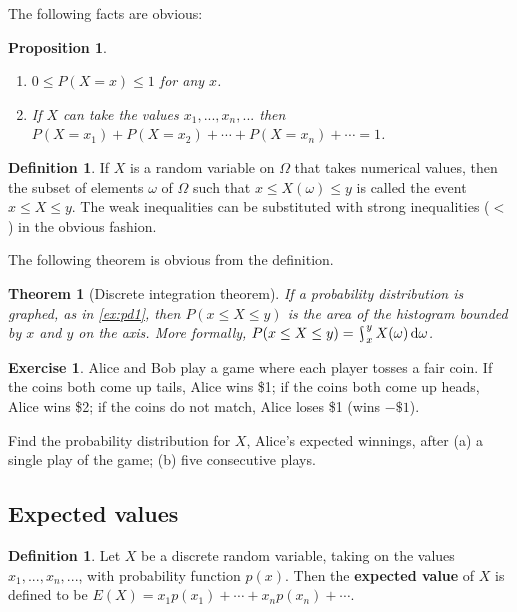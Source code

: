 \documentclass[a4paper,leqno]{article}
\DeclareMathOperator*{\rint}{\scalerel*{\rotatebox{17}{$\!\int\!$}}{\int}}
\numberwithin{equation}{section}
\newtheorem{thm}[equation]{Theorem}
\newtheorem{prp}[equation]{Proposition}
\theoremstyle{definition}
\newtheorem{defn}[equation]{Definition}
\newtheorem{exercise}[equation]{Exercise}
\theoremstyle{remark}
\newcommand{\df}{\textbf}
\begin{document}
The following facts are obvious:
\begin{prp}\label{prp:distfacts}\leavevmode
  \begin{enumerate}
    \item $ 0 \leq P(X = x) \leq 1 $ for any $ x $.
    \item If $ X $ can take the values $ x_1, ..., x_n, ... $ then $ P(X = x_1) + P(X = x_2) + \cdots + P(X = x_n) + \cdots = 1 $.
  \end{enumerate}
\end{prp}

\begin{defn}
  If $ X $ is a random variable on $ \Omega $ that takes numerical values, then the subset of elements $ \omega $ of $ \Omega $ such that $ x \leq X(\omega) \leq y $
  is called the event $ x \leq X \leq y $. The weak inequalities can be substituted with strong inequalities (${}<{}$) in the obvious fashion.
\end{defn}

The following theorem is obvious from the definition.
\begin{thm}[Discrete integration theorem]\label{thm:discreteintegration}
  If a probability distribution is graphed, as in \ref{ex:pd1}, then $ P(x \leq X \leq y) $ is the area of the histogram
  bounded by $ x $ and $ y $ on the axis. More formally, $ P(x \leq X \leq y) = \rint_x^y X(\omega) \dif{\omega} $.
\end{thm}

\begin{exercise}\label{exercise:cointoss1}
  Alice and Bob play a game where each player tosses a fair coin. If the coins both come up
  tails, Alice wins \$1; if the coins both come up heads, Alice wins \$2; if the coins do not
  match, Alice loses \$1 (wins $-\$1$).

  Find the probability distribution for $ X $, Alice's expected winnings, after (a) a single
  play of the game; (b) five consecutive plays.
\end{exercise}

\subsection{Expected values}
\begin{defn}
  Let $ X $ be a discrete random variable, taking on the values $ x_1,...,x_n,...$, with probability function $ p(x) $. Then
  the \df{expected value} of $ X $ is defined to be $ E(X) = x_1 p(x_1) + \cdots + x_n p(x_n) + \cdots $.
\end{defn}
\end{document}
